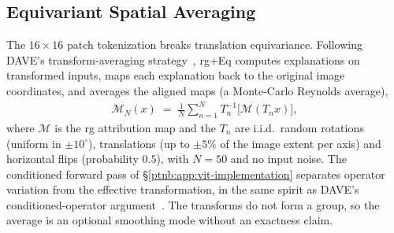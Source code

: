 \subsection{Equivariant Spatial Averaging}\label{ptnb:app:equivariant}

The $16{\times}16$ patch tokenization breaks translation equivariance. Following DAVE's
transform-averaging strategy~\parencite{Wrobel2024}, \ac{rg}+Eq computes explanations on transformed
inputs, maps each explanation back to the original image coordinates, and averages the aligned maps
(a Monte-Carlo Reynolds average),
\begin{align}\label{ptnb:eq:equivariant-average}
    \mathcal{M}_N(x) \;=\; \frac{1}{N}\sum_{n=1}^{N} T_n^{-1}\bigl[\mathcal{M}(T_n x)\bigr],
\end{align}
where $\mathcal{M}$ is the \ac{rg} attribution map and the $T_n$ are i.i.d.\ random rotations
(uniform in $\pm 10^\circ$), translations (up to $\pm 5\%$ of the image extent per axis) and
horizontal flips (probability $0.5$), with $N = 50$ and no input noise. The conditioned forward
pass of \S\ref{ptnb:app:vit-implementation} separates operator variation from the effective
transformation, in the same spirit as DAVE's conditioned-operator argument~\parencite{Wrobel2024}. The
transforms do not form a group, so the average is an optional smoothing mode without an exactness
claim.
\par\medskip
